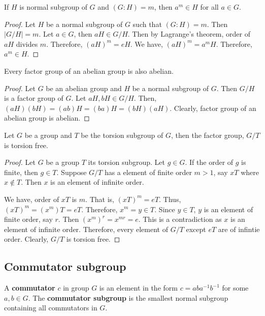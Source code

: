 \begin{remark}
	If $H$ is normal subgroup of $G$ and $(G:H) = m$, then $a^m \in H$ for all $a \in G$.%
\end{remark}
\begin{proof}
	Let $H$ be a normal subgroup of $G$ such that $(G:H) = m$. Then $|G/H| = m$. Let $a \in G$, then $aH \in G/H$. Then by Lagrange's theorem, order of $aH$ divides $m$. Therefore, $(aH)^m = eH$. We have, $(aH)^m = a^mH$. Therefore, $a^m \in H$.
\end{proof}

\begin{remark}
	Every factor group of an abelian group is also abelian.%
\end{remark}
\begin{proof}
	Let $G$ be an abelian group and $H$ be a normal subgroup of $G$. Then $G/H$ is a factor group of $G$. Let $aH, bH \in G/H$. Then, $(aH)(bH) = (ab)H = (ba)H = (bH)(aH)$. Clearly, factor group of an abelian group is abelian.
\end{proof}

\begin{remark}
	Let $G$ be a group and  $T$ be the torsion subgroup of $G$, then the factor group, $G/T$ is torsion free.%
\end{remark}
\begin{proof}
	Let $G$ be a group $T$ its torsion subgroup. Let $g \in G$. If the order of $g$ is finite, then $g \in T$. Suppose $G/T$ has a element of finite order $m > 1$, say $xT$ where $x \notin T$. Then $x$ is an element of infinite order.

	We have, order of $xT$ is $m$. That is, $(xT)^m = eT$. Thus, $(xT)^m = (x^m)T = eT$. Therefore, $x^m  = y \in T$. Since $y \in T$, $y$ is an element of finite order, say $r$. Then $(x^m)^r = x^{mr} = e$. This is a contradiction as $x$ is an element of infinite order. Therefore, every element of $G/T$ except $eT$ are of infintie order. Clearly, $G/T$ is torsion free.
\end{proof}

\subsection{Commutator subgroup}
\begin{definition}
	A \textbf{commutator} $c$ in group $G$ is an element in the form $c = aba^{-1}b^{-1}$ for some $a,b \in G$.
	The \textbf{commutator subgroup} is the smallest normal subgroup containing all commutators in $G$.
\end{definition}

